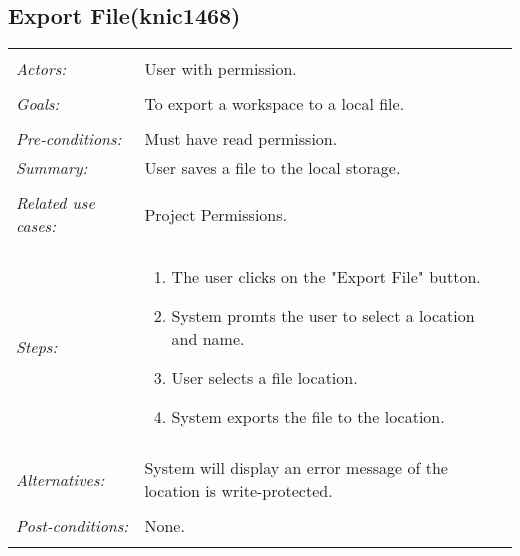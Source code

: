 \documentclass[11pt]{report}
\begin{document}
\subsection{Export File(knic1468)}
\begin{tabular}{ p{2cm} p{12cm} }
\hline
\\
\textit{Actors:} & User with permission.\\
\\
\textit{Goals:} & To export a workspace to a local file. \\
\\
\textit{Pre-conditions:} & Must have read permission. 
\\
\textit{Summary:} & User saves a file to the local storage. \\
\\
\textit{Related use cases:} & Project Permissions. \\
\\
\textit{Steps:} & \begin{enumerate}
 \item The user clicks on the "Export File" button. 
 \item System promts the user to select a location and name. 
 \item User selects a file location. 
 \item System exports the file to the location. 
 \end{enumerate}\\
 \\
 \textit{Alternatives:} & System will display an error message of the location is write-protected.\\
 \\
 \textit{Post-conditions:} & None. \\
 \\
\hline
\end{tabular}
\end{document}
